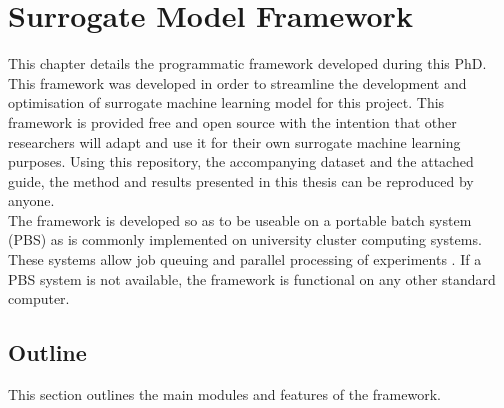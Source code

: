 \chapter{Surrogate Model Framework}
\label{cha:framework}


This chapter details the programmatic framework \cite{Jones2018} developed during this PhD. This framework was developed in order to streamline the development and optimisation of surrogate machine learning model for this project. This framework is provided free and open source with the intention that other researchers will adapt and use it for their own surrogate machine learning purposes. Using this repository, the accompanying dataset \cite{huw_rhys_jones_2022_6967536} and the attached guide, the method and results presented in this thesis can be reproduced by anyone.
\\

\noindent
The framework is developed so as to be useable on a portable batch system (PBS) as is commonly implemented on university cluster computing systems. These systems allow job queuing and parallel processing of experiments \cite{henderson1995job}. If a PBS system is not available, the framework is functional on any other standard computer.

\section{Outline}

This section outlines the main modules and features of the framework. 


